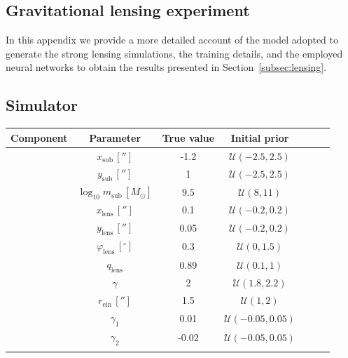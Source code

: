 \begin{subappendices}
\section{Gravitational lensing experiment}
\label{apx:anre-lensing}

 In this appendix we provide a more detailed account of the model adopted to generate the strong lensing simulations, the training details, and the employed neural networks to obtain the results presented in Section~\ref{subsec:lensing}.

\subsection{Simulator}

\begin{table}
    \centering
    \renewcommand{\arraystretch}{1.2}
    \begin{tabular}{c c c c c c c}
        \hline
        Component & Parameter & True value & Initial prior  \\
        \hline
        \parbox[t]{1mm}{}
        & $x_\mathrm{sub}\, ['']$ & -1.2 & $\mathcal{U}(-2.5, 2.5)$ \\
        & $y_\mathrm{sub}\, ['']$ & 1 & $\mathcal{U}(-2.5, 2.5)$ \\
        & $\log_{10} m_\mathrm{sub}\, [M_\odot]$ & $9.5$ & $\mathcal{U}(8, 11)$ \\
        \hline
        \parbox[t]{1mm}{}
        & $x_\mathrm{lens}\, ['']$ & 0.1 & $\mathcal{U}(-0.2, 0.2)$  \\
        & $y_\mathrm{lens}\, ['']$ & 0.05 & $\mathcal{U}(-0.2, 0.2)$ \\
        & $\varphi_\mathrm{lens} \, [^\circ]$ & 0.3 & $\mathcal{U}(0, 1.5)$ \\
        & $q_\mathrm{lens}$ & 0.89 & $\mathcal{U}(0.1, 1)$ \\
        & $\gamma$ & 2 & $\mathcal{U}(1.8, 2.2)$ \\
        & $r_\mathrm{ein}\, ['']$ & 1.5 & $\mathcal{U}(1, 2)$ \\
        \hline
        \parbox[t]{1mm}{}
        & $\gamma_1$ & 0.01 & $\mathcal{U}(-0.05, 0.05)$  \\
        & $\gamma_2$ & -0.02 & $\mathcal{U}(-0.05, 0.05)$ \\
        \hline
        \parbox[t]{1mm}{}

\end{tabular}
\end{table}
\end{subappendices}
